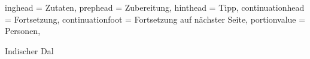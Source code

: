 \begin{otherlanguage}{ngerman}

\setHeadlines
{%
    inghead = Zutaten,
    prephead = Zubereitung,
    hinthead = Tipp,
    continuationhead = Fortsetzung,
    continuationfoot = Fortsetzung auf n\"achster Seite,
    portionvalue = Personen,
}

\begin{recipe}
[ %
    preparationtime = {\unit[20]{Minuten}},
    portion = {\portion{2}},
    source = Unkown
]
{Indischer Dal}
    \graph
    {%
    }
    \ingredients
    {%
    }


    \hint
    {%
    }

\end{recipe}

\end{otherlanguage}
